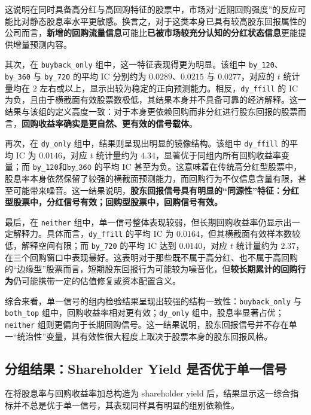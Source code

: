\documentclass[a4paper,10pt]{article}
\begin{document}
这说明在同时具备高分红与高回购特征的股票中，市场对“近期回购强度”的反应可能比对静态股息率水平更敏感。换言之，对于这类本身已具有较高股东回报属性的公司而言，\textbf{新增的回购流量信息}可能比\textbf{已被市场较充分认知的分红状态信息}更能提供增量预测内容。

其次，在 \texttt{buyback\_only} 组中，这一特征表现得更为明显。该组中 \texttt{by\_120}、\texttt{by\_360} 与 \texttt{by\_720} 的平均 IC 分别约为 $0.0289$、$0.0215$ 与 $0.0277$，对应的 $t$ 统计量均在 $2$ 左右或以上，显示出较为稳定的正向预测能力。相反，\texttt{dy\_ffill} 的 IC 为负，且由于横截面有效股票数极低，其结果本身并不具备可靠的经济解释。这一结果与该组的定义高度一致：对于本身更依赖回购而非分红进行股东回报的股票而言，\textbf{回购收益率确实是更自然、更有效的信号载体}。

再次，在 \texttt{dy\_only} 组中，结果则呈现出明显的镜像结构。该组中 \texttt{dy\_ffill} 的平均 IC 为 $0.0146$，对应 $t$ 统计量约为 $4.34$，显著优于同组内所有回购收益率变量；而 \texttt{by\_120}$ 和 \texttt{by\_360}$ 的平均 IC 甚至为负。这意味着在传统高分红型股票中，股息率本身依然保留了较强的横截面预测能力，而回购行为不仅信息含量有限，甚至可能带来噪音。这一结果说明，\textbf{股东回报信号具有明显的“同源性”特征：分红型股票中，分红信号有效；回购型股票中，回购信号有效。}

最后，在 \texttt{neither} 组中，单一信号整体表现较弱，但长期回购收益率仍显示出一定解释力。具体而言，\texttt{dy\_ffill} 的平均 IC 为 $0.0164$，但其横截面有效样本数较低，解释空间有限；而 \texttt{by\_720} 的平均 IC 达到 $0.0140$，对应 $t$ 统计量约为 $2.37$，在三个回购窗口中表现最好。这表明对于那些既不属于高分红、也不属于高回购的“边缘型”股票而言，短期股东回报行为可能较为噪音化，但\textbf{较长期累计的回购行为}仍可能携带一定的估值修复或资本配置含义。

综合来看，单一信号的组内检验结果呈现出较强的结构一致性：\texttt{buyback\_only} 与 \texttt{both\_top} 组中，回购收益率相对更有效；\texttt{dy\_only} 组中，股息率显著占优；\texttt{neither} 组则更偏向于长期回购信号。这一结果说明，股东回报信号并不存在单一“统治性”变量，其有效性很大程度上取决于股票本身的股东回报风格。

\subsection{分组结果：Shareholder Yield 是否优于单一信号}

在将股息率与回购收益率加总构造为 shareholder yield 后，结果显示这一综合指标并不总是优于单一信号，其表现同样具有明显的组别依赖性。
\end{document}
